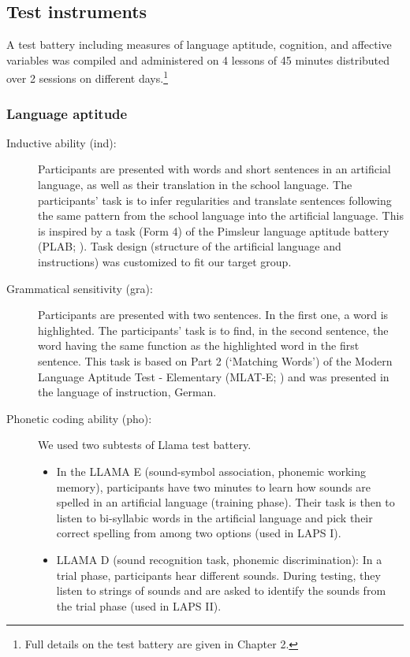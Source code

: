 \documentclass[output=paper]{langsci/langscibook}
\begin{document}
\subsection{Test instruments} 

A test battery including measures of language aptitude, cognition, and affective variables was compiled and administered on 4 lessons of 45 minutes distributed over 2 sessions on different days.\footnote{Full details on the test battery are given in Chapter 2.}

\subsubsection{Language aptitude}

\begin{description}
\item[Inductive ability (ind):] Participants are presented with words and short sentences in an artificial language, as well as their translation in the school language. The participants’ task is to infer regularities and translate sentences following the same pattern from the school language into the artificial language. This is inspired by a task (Form 4) of the Pimsleur language aptitude battery (PLAB; \citealt{Pimsleur1966}). Task design (structure of the artificial language and instructions) was customized to fit our target group.

\item[Grammatical sensitivity (gra):] Participants are presented with two sentences. In the first one, a word is highlighted. The participants’ task is to find, in the second sentence, the word having the same function as the highlighted word in the first sentence. This task is based on Part 2 (‘Matching Words’) of the Modern Language Aptitude Test - Elementary (MLAT-E; \citealt{CarrollSapon1976}) and was presented in the language of instruction, German.

\item[Phonetic coding ability (pho):] We used two subtests of  Llama test battery.

\begin{itemize}
\item In the LLAMA E (sound-symbol association, phonemic working memory), participants have two minutes to learn how sounds are spelled in an artificial language (training phase). Their task is then to listen to bi-syllabic words in the artificial language and pick their correct spelling from among two options (used in LAPS I).
\item LLAMA D (sound recognition task, phonemic discrimination): In a trial phase, participants hear different sounds. During testing, they listen to strings of sounds and are asked to identify the sounds from the trial phase (used in LAPS II).
\end{itemize}
\end{description}
\end{document}
